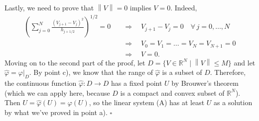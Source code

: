 \documentclass[a4paper]{article}
\newcommand{\norm}[1]{\left\lVert #1 \right\rVert}
\newcommand{\R}{\mathbb{R}}
\begin{document}
\begin{enumerate}[label=\textbf{\alph*)},leftmargin=*]
	Lastly, we need to prove that $\norm{V} = 0$ implies $V=0$. Indeed,
	\begin{align*}
	\left( \sum_{j=0}^N \frac{(V_{j+1}-V_j)^2}{h_{j+1/2}} \right)^{1/2} = 0
&	\quad \Longrightarrow \quad V_{j+1}-V_j=0 \quad \forall \, j = 0,\dots,N \\
&	\quad \Longrightarrow \quad V_0 = V_1 = \dots = V_N = V_{N+1} = 0 \\
&	\quad \Longrightarrow \quad V = 0.
	\end{align*}
	Moving on to the second part of the proof, let
	$D = \{V \in \R^N \mid \norm{V} \leq M\}$ and let $\hat{\varphi} = \varphi |_D$.
	By point c), we know that the range of $\hat{\varphi}$ is a subset of $D$.
	Therefore, the continuous function $\hat{\varphi} \colon D \to D$ has a
	fixed point $U$ by Brouwer's theorem (which we can apply here, because $D$
	is a compact and convex subset of $\R^N$).
	Then $U = \hat{\varphi}(U) = \varphi(U)$, so the linear system (A)
	has at least $U$ as a solution by what we've proved in point a). $\square$
\end{enumerate}
\end{document}

